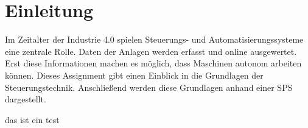 \section{Einleitung}
Im Zeitalter der Industrie 4.0 spielen Steuerungs- und Automatisierungssysteme eine zentrale Rolle. Daten der Anlagen werden erfasst und online ausgewertet. Erst diese Informationen machen es möglich, dass Maschinen autonom arbeiten können.\autocite[vgl.][24]{Seitz2021} Dieses Assignment gibt einen Einblick in die Grundlagen der Steuerungstechnik. Anschließend werden diese Grundlagen anhand einer \ac{SPS} dargestellt.\autocite{Seitz2021}

das ist ein test \autocite{oV2021}